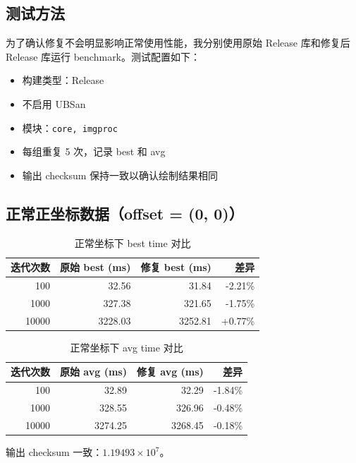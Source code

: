 \documentclass[12pt,a4paper]{article}
\begin{document}
\subsection{测试方法}

为了确认修复不会明显影响正常使用性能，我分别使用原始 Release 库和修复后 Release 库运行 benchmark。测试配置如下：

\begin{itemize}[leftmargin=*]
    \item 构建类型：Release
    \item 不启用 UBSan
    \item 模块：\texttt{core, imgproc}
    \item 每组重复 5 次，记录 best 和 avg
    \item 输出 checksum 保持一致以确认绘制结果相同
\end{itemize}

\subsection{正常正坐标数据（offset = (0, 0)）}

\begin{table}[h]
\centering
\caption{正常坐标下 best time 对比}
\begin{tabular}{rrrr}
\toprule
\textbf{迭代次数} & \textbf{原始 best (ms)} & \textbf{修复 best (ms)} & \textbf{差异} \\
\midrule
100   & 32.56 & 31.84 & -2.21\% \\
1000  & 327.38 & 321.65 & -1.75\% \\
10000 & 3228.03 & 3252.81 & +0.77\% \\
\bottomrule
\end{tabular}
\end{table}

\begin{table}[h]
\centering
\caption{正常坐标下 avg time 对比}
\begin{tabular}{rrrr}
\toprule
\textbf{迭代次数} & \textbf{原始 avg (ms)} & \textbf{修复 avg (ms)} & \textbf{差异} \\
\midrule
100   & 32.89 & 32.29 & -1.84\% \\
1000  & 328.55 & 326.96 & -0.48\% \\
10000 & 3274.25 & 3268.45 & -0.18\% \\
\bottomrule
\end{tabular}
\end{table}

输出 checksum 一致：$1.19493 \times 10^7$。
\end{document}

